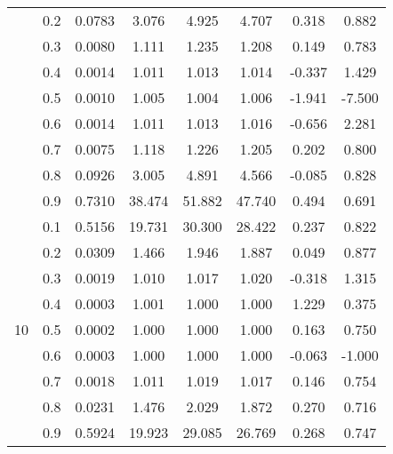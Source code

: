 \documentclass[11pt,a4paper]{report}
\begin{document}
\begin{longtable}{ | c | c || c | c | c | c | c | c | }
 & 0.2 & 0.0783 & 3.076 & 4.925 & 4.707 & 0.318 & 0.882 \\
 & 0.3 & 0.0080 & 1.111 & 1.235 & 1.208 & 0.149 & 0.783 \\
 & 0.4 & 0.0014 & 1.011 & 1.013 & 1.014 & -0.337 & 1.429 \\
 & 0.5 & 0.0010 & 1.005 & 1.004 & 1.006 & -1.941 & -7.500 \\
 & 0.6 & 0.0014 & 1.011 & 1.013 & 1.016 & -0.656 & 2.281 \\
 & 0.7 & 0.0075 & 1.118 & 1.226 & 1.205 & 0.202 & 0.800 \\
 & 0.8 & 0.0926 & 3.005 & 4.891 & 4.566 & -0.085 & 0.828 \\
 & 0.9 & 0.7310 & 38.474 & 51.882 & 47.740 & 0.494 & 0.691 \\
 \hline
\multirow{9}{*}{10} & 0.1 & 0.5156 & 19.731 & 30.300 & 28.422 & 0.237 & 0.822 \\
 & 0.2 & 0.0309 & 1.466 & 1.946 & 1.887 & 0.049 & 0.877 \\
 & 0.3 & 0.0019 & 1.010 & 1.017 & 1.020 & -0.318 & 1.315 \\
 & 0.4 & 0.0003 & 1.001 & 1.000 & 1.000 & 1.229 & 0.375 \\
 & 0.5 & 0.0002 & 1.000 & 1.000 & 1.000 & 0.163 & 0.750 \\
 & 0.6 & 0.0003 & 1.000 & 1.000 & 1.000 & -0.063 & -1.000 \\
 & 0.7 & 0.0018 & 1.011 & 1.019 & 1.017 & 0.146 & 0.754 \\
 & 0.8 & 0.0231 & 1.476 & 2.029 & 1.872 & 0.270 & 0.716 \\
 & 0.9 & 0.5924 & 19.923 & 29.085 & 26.769 & 0.268 & 0.747 \\
 \hline
\hline
\end{longtable}
\end{document}
